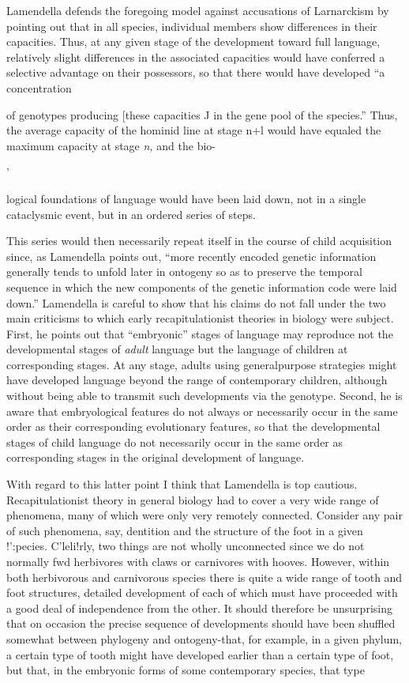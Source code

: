 Lamendella defends the foregoing model against accusations of Larnarckism by pointing out that in all species, individual members show differences in their capacities. Thus, at any given stage of the development toward full language, relatively slight differences in the associated capacities would have conferred a selective advantage on their possessors, so that there would have developed ``a concentration

of genotypes producing [these capacities J in the gene pool of the species.'' Thus, the average capacity of the hominid line at stage n+l would have equaled the maximum capacity at stage \textit{n,} and the bio-

'


logical foundations of language would have been laid down, not in a single cataclysmic event, but in an ordered series of steps.

This series would then necessarily repeat itself in the course of child acquisition since, as Lamendella points out, ``more recently en\-coded genetic information generally tends to unfold later in ontogeny so as to preserve the temporal sequence in which the new components of the genetic information code were laid down.'' Lamendella is careful to show that his claims do not fall under the two main criticisms to which early recapitulationist theories in biology were subject. First, he points out that ``embryonic'' stages of language may reproduce not the developmental stages of \textit{adult} language but the language of children at corresponding stages. At any stage, adults using general\-purpose strategies might have developed language beyond the range of contemporary children, although without being able to transmit such developments via the genotype. Second, he is aware that embryological features do not always or necessarily occur in the same order as their corresponding evolutionary features, so that the developmental stages of child language do not necessarily occur in the same order as corre\-sponding stages in the original development of language.

With regard to this latter point I think that Lamendella is top cautious. Recapitulationist theory in general biology had to cover a very wide range of phenomena, many of which were only very re\-motely connected. Consider any pair of such phenomena, say, dentition and the structure of the foot in a given !':pecies. C'leli!rly, two things are not wholly unconnected since we do not normally fwd herbivores with claws or carnivores with hooves. However, within both herbivorous and carnivorous species there is quite a wide range of tooth and foot structures, detailed development of each of which must have proceeded with a good deal of independence from the other. It should therefore be unsurprising that on occasion the precise sequence of developments should have been shuffled somewhat between phylogeny and ontogeny{}-that, for example, in a given phylum, a certain type of tooth might have developed earlier than a certain type of foot, but that, in the embryonic forms of some contemporary species, that type

